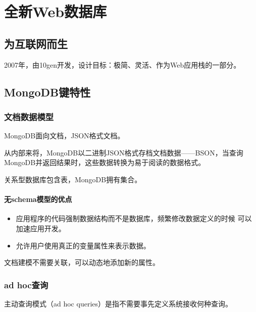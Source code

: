 \chapter{全新Web数据库}
\section{为互联网而生}
2007年，由10gen开发，设计目标：极简、灵活、作为Web应用栈的一部分。

\section{MongoDB键特性}
\subsection{文档数据模型}
MongoDB面向文档，JSON格式文档。
\par 从内部来将，MongoDB以二进制JSON格式存档文档数据——BSON，当查询MongoDB并返回结果时，这些数据转换为易于阅读的数据格式。
\par 关系型数据库包含表，MongoDB拥有集合。
\subsubsection*{无schema模型的优点}
\begin{itemize}
	\item 应用程序的代码强制数据结构而不是数据库，频繁修改数据定义的时候
	可以加速应用开发。
	\item 允许用户使用真正的变量属性来表示数据。
\end{itemize}
\par 文档建模不需要关联，可以动态地添加新的属性。
\subsection{ad hoc查询}
主动查询模式（ad hoc queries）是指不需要事先定义系统接收何种查询。
